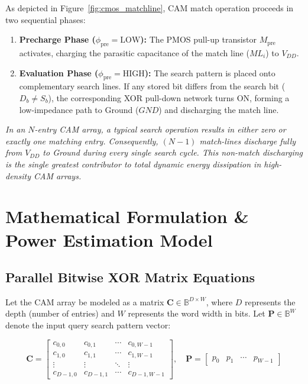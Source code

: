 \documentclass[11pt,a4paper,oneside]{report}
\begin{document}
As depicted in Figure~\ref{fig:cmos_matchline}, CAM match operation proceeds in two sequential phases:
\begin{enumerate}[leftmargin=*]
    \item \textbf{Precharge Phase ($\phi_{\text{pre}} = \text{LOW}$):} The PMOS pull-up transistor $M_{\text{pre}}$ activates, charging the parasitic capacitance of the match line ($ML_i$) to $V_{DD}$.
    \item \textbf{Evaluation Phase ($\phi_{\text{pre}} = \text{HIGH}$):} The search pattern is placed onto complementary search lines. If any stored bit differs from the search bit ($D_b \ne S_b$), the corresponding XOR pull-down network turns ON, forming a low-impedance path to Ground ($GND$) and discharging the match line.
\end{enumerate}

\begin{insightbox}
\textit{In an $N$-entry CAM array, a typical search operation results in either zero or exactly one matching entry. Consequently, $(N-1)$ match-lines discharge fully from $V_{DD}$ to Ground during every single search cycle. This non-match discharging is the single greatest contributor to total dynamic energy dissipation in high-density CAM arrays.}
\end{insightbox}

\chapter[Mathematical Power Model]{Mathematical Formulation \& Power Estimation Model}

\section{Parallel Bitwise XOR Matrix Equations}
Let the CAM array be modeled as a matrix $\mathbf{C} \in \mathbb{B}^{D \times W}$, where $D$ represents the depth (number of entries) and $W$ represents the word width in bits. Let $\mathbf{P} \in \mathbb{B}^{W}$ denote the input query search pattern vector:

\begin{equation}
\mathbf{C} = \begin{bmatrix}
c_{0,0} & c_{0,1} & \cdots & c_{0,W-1} \\
c_{1,0} & c_{1,1} & \cdots & c_{1,W-1} \\
\vdots & \vdots & \ddots & \vdots \\
c_{D-1,0} & c_{D-1,1} & \cdots & c_{D-1,W-1}
\end{bmatrix}, \quad
\mathbf{P} = \begin{bmatrix} p_0 & p_1 & \cdots & p_{W-1} \end{bmatrix}
\end{equation}
\end{document}
